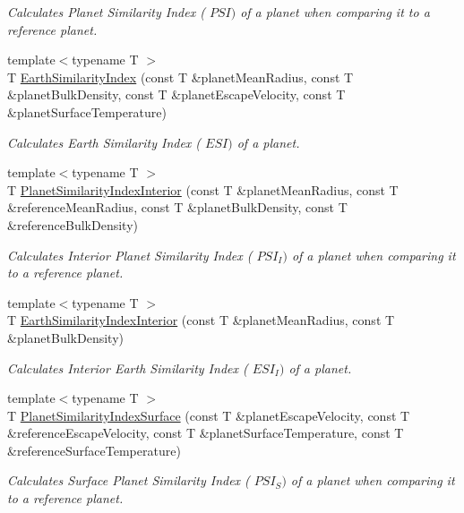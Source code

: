 \begin{DoxyCompactItemize}
\begin{DoxyCompactList}\small\item\em Calculates Planet Similarity Index ( $PSI)$ of a planet when comparing it to a reference planet. \end{DoxyCompactList}\item 
{\footnotesize template$<$typename T $>$ }\\T \hyperlink{group___astrophysics_ga4b86397b1c839c49ac599d49fda207d4}{Earth\+Similarity\+Index} (const T \&planet\+Mean\+Radius, const T \&planet\+Bulk\+Density, const T \&planet\+Escape\+Velocity, const T \&planet\+Surface\+Temperature)
\begin{DoxyCompactList}\small\item\em Calculates Earth Similarity Index ( $ESI)$ of a planet. \end{DoxyCompactList}\item 
{\footnotesize template$<$typename T $>$ }\\T \hyperlink{group___astrophysics_ga6dc06a1a8baf6e132abed51fcf410c7f}{Planet\+Similarity\+Index\+Interior} (const T \&planet\+Mean\+Radius, const T \&reference\+Mean\+Radius, const T \&planet\+Bulk\+Density, const T \&reference\+Bulk\+Density)
\begin{DoxyCompactList}\small\item\em Calculates Interior Planet Similarity Index ( $PSI_I)$ of a planet when comparing it to a reference planet. \end{DoxyCompactList}\item 
{\footnotesize template$<$typename T $>$ }\\T \hyperlink{group___astrophysics_ga699bcc2f17b8855eaa856595d8032f61}{Earth\+Similarity\+Index\+Interior} (const T \&planet\+Mean\+Radius, const T \&planet\+Bulk\+Density)
\begin{DoxyCompactList}\small\item\em Calculates Interior Earth Similarity Index ( $ESI_I)$ of a planet. \end{DoxyCompactList}\item 
{\footnotesize template$<$typename T $>$ }\\T \hyperlink{group___astrophysics_gae0c7dce2779d66b0560ca388a34ddc39}{Planet\+Similarity\+Index\+Surface} (const T \&planet\+Escape\+Velocity, const T \&reference\+Escape\+Velocity, const T \&planet\+Surface\+Temperature, const T \&reference\+Surface\+Temperature)
\begin{DoxyCompactList}\small\item\em Calculates Surface Planet Similarity Index ( $PSI_S)$ of a planet when comparing it to a reference planet. \end{DoxyCompactList}\item 

\end{DoxyCompactItemize}
